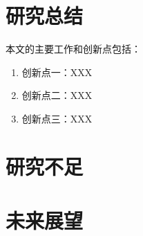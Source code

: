 \section{研究总结}
\label{sec:conclusion}

本文的主要工作和创新点包括：

\begin{enumerate}
  \item 创新点一：XXX
  \item 创新点二：XXX
  \item 创新点三：XXX
\end{enumerate}

\section{研究不足}
\label{sec:limitations}

\section{未来展望}
\label{sec:future}
